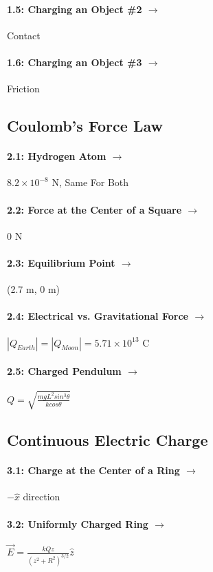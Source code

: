 \documentclass[11pt]{article}
\begin{document}
\paragraph{1.5: Charging an Object \#2 $\rightarrow$} Contact
\paragraph{1.6: Charging an Object \#3 $\rightarrow$} Friction
\vspace{15pt}

\subsection*{Coulomb's Force Law}
\paragraph{2.1: Hydrogen Atom $\rightarrow$} $8.2 \times 10^{-8}$ N, Same For Both
\paragraph{2.2: Force at the Center of a Square $\rightarrow$} 0 N
\paragraph{2.3: Equilibrium Point $\rightarrow$} (2.7 m, 0 m)
\paragraph{2.4: Electrical vs. Gravitational Force $\rightarrow$} $|Q_{Earth}| = |Q_{Moon}| = 5.71\times10^{13}$ C
\paragraph{2.5: Charged Pendulum $\rightarrow$} $Q = \sqrt{\frac{mgL^2sin^3\theta}{kcos\theta}}$
\vspace{15pt}

\subsection*{Continuous Electric Charge}
\paragraph{3.1: Charge at the Center of a Ring $\rightarrow$} $-\hat{x}$ direction
\paragraph{3.2: Uniformly Charged Ring $\rightarrow$} $\vec{E} = \frac{kQz}{(z^2 + R^2)^{3/2}}\hat{z}$
\end{document}
